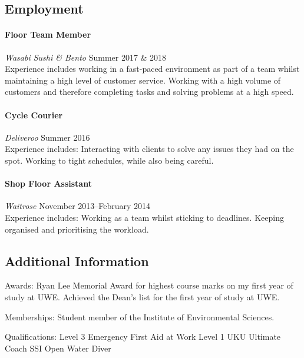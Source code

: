 \documentclass[11pt,a4paper]{article}
\newcommand{\centry}[3]{\paragraph{#1} \textit{#2}%
\hfill#3\\[2pt]}
\begin{document}
\subsection*{Employment}

\centry{Floor Team Member}{Wasabi Sushi \& Bento}{Summer 2017 \& 2018}

Experience includes working in a fast-paced environment as part of a team whilst 
maintaining a high level of customer service. Working with a high volume of 
customers and therefore completing tasks and solving problems at a high speed. 

\centry{Cycle Courier}{Deliveroo}{Summer 2016}

Experience includes: Interacting with clients to solve any issues they had on 
the spot. Working to tight schedules, while also being careful. 


\centry{Shop Floor Assistant}{Waitrose}{November 2013--February 2014}

Experience includes: Working as a team whilst sticking to deadlines. 
Keeping organised and prioritising the workload.



\subsection*{Additional Information}

Awards: Ryan Lee Memorial Award for highest course marks on my first year of study at UWE. 
        Achieved the Dean’s list for the first year of study at UWE. 
        
Memberships: Student member of the Institute of Environmental Sciences.

Qualifications: Level 3 Emergency First Aid at Work
                Level 1 UKU Ultimate Coach
                SSI Open Water Diver
\end{document}

